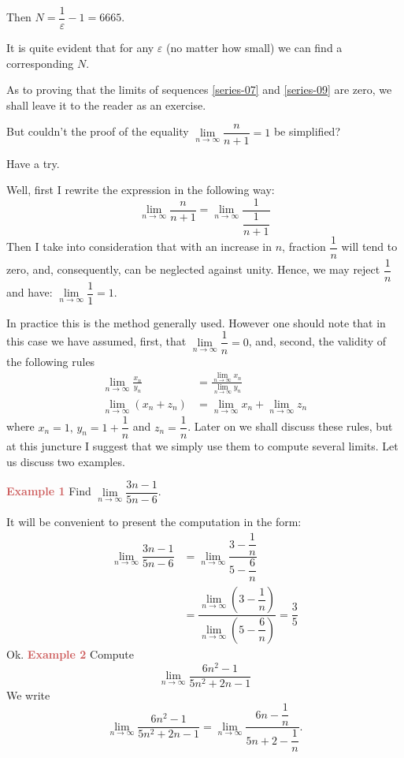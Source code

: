 {\rdr Then $N = \dfrac{1}{\varepsilon} - 1 = 6665$.

\athr It is quite evident that for any $\varepsilon$ (no matter how small) we can find a corresponding $N$.

As to proving that the limits of sequences \eqref{series-07} and \eqref{series-09} are zero, we shall leave it to the reader as an exercise.

\rdr But couldn't the proof of the equality $\lim\limits_{n \to \infty} \dfrac{n}{n+1} = 1$ be simplified?

\athr Have a try.

\rdr Well, first I rewrite the expression in the following way:
\begin{equation*}%
\lim\limits_{n \to \infty} \dfrac{n}{n+1} = \lim\limits_{n \to \infty} \dfrac{1}{\dfrac{1}{n+1}}
\end{equation*}
Then I take into consideration that with an increase in $n$, fraction $\dfrac{1}{n}$ will tend to zero, and, consequently, can be neglected against unity. Hence, we may reject $\dfrac{1}{n}$ and have:  $ \lim\limits_{n \to \infty} \dfrac{1}{1} = 1 $.

\athr In practice this is the method generally used. However	one should note that in this case we have assumed,
first, that $ \lim\limits_{n \to \infty} \dfrac{1}{n} = 0 $, and, second, the validity of the following rules
\begin{align}%
\lim\limits_{n \to \infty} \frac{x_{n}}{y_{n}} & = \frac{\lim\limits_{n \to \infty} x_{n}}{\lim\limits_{n \to \infty} y_{n}} \label{lim-div}\\
\lim\limits_{n \to \infty} (x_{n} + z_{n}) & =\lim\limits_{n \to \infty} x_{n} + \lim\limits_{n \to \infty} z_{n} \label{lim-sum}
\end{align} 
where $x_{n} =1, \, y_{n} = 1 + \dfrac{1}{n}$ and $z_{n} = \dfrac{1}{n}$. Later on we shall discuss these rules, but at this juncture I suggest that we simply use them to compute several limits. Let us discuss two examples.	

\textcolor{IndianRed}{\bf Example 1} Find $ \lim\limits_{n \to \infty} \dfrac{3n - 1}{5n - 6} $.

\rdr It will be convenient to present the computation in the form:
\begin{align*}%
\lim\limits_{n \to \infty} \dfrac{3n - 1}{5n - 6} & = \lim\limits_{n \to \infty} \dfrac{3 - \dfrac{1}{n}}{5 - \dfrac{6}{n}} \\
& = \dfrac{\lim\limits_{n \to \infty} \left(3 - \dfrac{1}{n}\right)}{\lim\limits_{n \to \infty} \left(5 - \dfrac{6}{n}\right)}
= \dfrac{3}{5}
\end{align*} 
\athr Ok. \textcolor{IndianRed}{\bf Example 2} Compute
\begin{equation*}%
\lim\limits_{n \to \infty} \dfrac{6n^{2} - 1}{5n^{2} +2n -1} 
\end{equation*}
\rdr We write
\begin{equation*}%
\lim\limits_{n \to \infty} \dfrac{6n^{2} - 1}{5n^{2} +2n -1}  = \lim\limits_{n \to \infty} \dfrac{6n - \dfrac{1}{n}}{5n +2 - \dfrac{1}{n}}.
\end{equation*}

}

